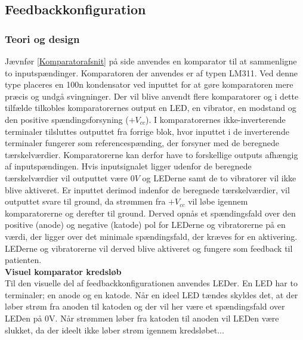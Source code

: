 \subsection{Feedbackkonfiguration}
\subsubsection{Teori og design}
Jævnfør \ref{Komparatorafsnit} på side \pageref{Komparatorafsnit} anvendes en komparator til at sammenligne to inputspændinger. Komparatoren der anvendes er af typen LM311. Ved denne type placeres en 100n kondensator ved inputtet for at gøre komparatoren mere præcis og undgå svingninger\cite{Instruments2015}. Der vil blive anvendt flere komparatorer og i dette tilfælde tilkobles komparatorernes output en LED, en vibrator, en modstand og den positive spændingsforsyning ($+V_{cc}$). I komparatorernes ikke-inverterende terminaler tilsluttes outputtet fra forrige blok, hvor inputtet i de inverterende terminaler fungerer som referencespænding, der forsyner med de beregnede tærskelværdier. Komparatorerne kan derfor have to forskellige outputs afhængig af inputspændingen. Hvis inputsignalet ligger udenfor de beregnede tærskelværdier vil outputtet være $0V$ og LEDerne samt de to vibratorer vil ikke blive aktiveret. Er inputtet derimod indenfor de beregnede tærskelværdier, vil outputtet svare til ground, da strømmen fra $+V_{cc}$ vil løbe igennem komparatorerne og derefter til ground. Derved opnås et spændingsfald over den positive (anode) og negative (katode) pol for LEDerne og vibratorerne på en værdi, der ligger over det minimale spændingsfald, der kræves for en aktivering. LEDerne og vibratorerne vil derved blive aktiveret og fungere som feedback til patienten. \\



\noindent\textbf{Visuel komparator kredsløb} \\
Til den visuelle del af feedbackkonfigurationen anvendes LEDer. En LED har to terminaler; en anode og en katode. Når en ideel LED tændes skyldes det, at der løber strøm fra anoden til katoden og der vil her være et spændingsfald over LEDen på 0V. Når strømmen løber fra katoden til anoden vil LEDen være slukket, da der ideelt ikke løber strøm igennem kredsløbet...  

